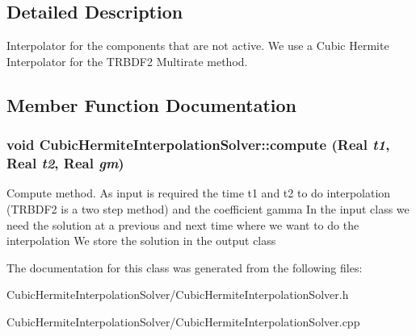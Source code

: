 \subsection{Detailed Description}
Interpolator for the components that are not active. We use a Cubic Hermite Interpolator for the TRBDF2 Multirate method. 

\subsection{Member Function Documentation}
\hypertarget{classCubicHermiteInterpolationSolver_ac82c752ef418ef7ceb0172f645e01543}{
\subsubsection[{compute}]{\setlength{\rightskip}{0pt plus 5cm}void CubicHermiteInterpolationSolver::compute (Real {\em t1}, \/  Real {\em t2}, \/  Real {\em gm})}}
\label{classCubicHermiteInterpolationSolver_ac82c752ef418ef7ceb0172f645e01543}


Compute method. As input is required the time t1 and t2 to do interpolation (TRBDF2 is a two step method) and the coefficient gamma In the input class we need the solution at a previous and next time where we want to do the interpolation We store the solution in the output class 

The documentation for this class was generated from the following files:\begin{DoxyCompactItemize}
\item 
CubicHermiteInterpolationSolver/CubicHermiteInterpolationSolver.h\item 
CubicHermiteInterpolationSolver/CubicHermiteInterpolationSolver.cpp\end{DoxyCompactItemize}
